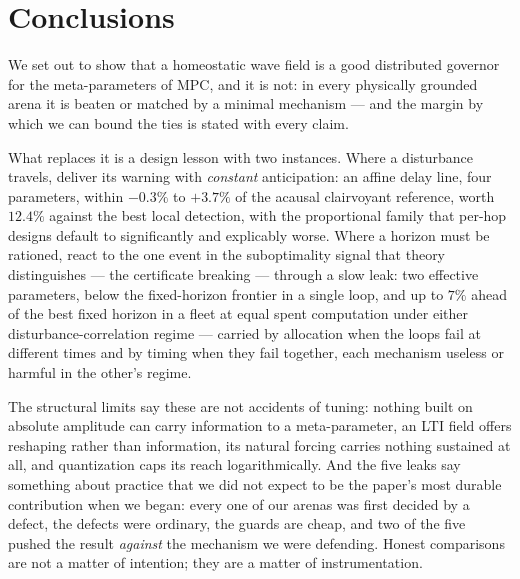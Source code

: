 \documentclass[journal]{IEEEtran}
\theoremstyle{definition}
\begin{document}
\section{Conclusions}\label{sec:conclusions}
We set out to show that a homeostatic wave field is a good distributed
governor for the meta-parameters of MPC, and it is not: in every physically
grounded arena it is beaten or matched by a minimal mechanism --- and the
margin by which we can bound the ties is stated with every claim.

What replaces it is a design lesson with two instances. Where a disturbance
travels, deliver its warning with \emph{constant} anticipation: an affine
delay line, four parameters, within $-0.3\%$ to $+3.7\%$ of the acausal
clairvoyant reference, worth $12.4\%$ against the best local detection, with the proportional family that
per-hop designs default to significantly and explicably worse. Where a
horizon must be rationed, react to the one event in the suboptimality signal
that theory distinguishes --- the certificate breaking --- through a slow
leak: two effective parameters, below the fixed-horizon frontier in a single
loop, and up to $7\%$ ahead of the best fixed horizon in a fleet at equal
spent computation under either disturbance-correlation regime --- carried by
allocation when the loops fail at different times and by timing when they fail
together, each mechanism useless or harmful in the other's regime.

The structural limits say these are not accidents of tuning: nothing built on
absolute amplitude can carry information to a meta-parameter, an LTI field
offers reshaping rather than information, its natural forcing carries nothing
sustained at all, and quantization caps its reach logarithmically. And the
five leaks say something about practice that we did not expect to be the
paper's most durable contribution when we began: every one of our arenas was
first decided by a defect, the defects were ordinary, the guards are cheap,
and two of the five pushed the result \emph{against} the mechanism we were
defending. Honest comparisons are not a matter of intention; they are a
matter of instrumentation.
\end{document}
